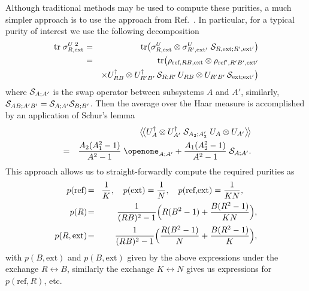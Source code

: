 \documentclass[twocolumn,aps,prl,amsmath,amssymb,floatfix]{revtex4}
\begin{document}
Although traditional methods \cite{Mello90} may be used to compute these
purities, a much simpler approach is to use the approach from
Ref.~. In particular, for a typical purity of interest
we use the following decomposition
\begin{eqnarray}
\text{tr}\; \sigma_{R,\text{ext}}^{U\;2}
&=& \text{tr} \bigl( \sigma_{R,\text{ext}}^U
\otimes \sigma_{R',\text{ext}'}^U \;
{\cal S}_{R,\text{ext};R',\text{ext}'}\bigr)\\
&=& \text{tr} \bigl( \rho_{\text{ref},RB,\text{ext}}\otimes
\rho_{\text{ref}',R'B',\text{ext}'}\nonumber\\
&&\times U_{RB}^\dagger\otimes U_{R'B'}^\dagger\,
{\cal S}_{R;R'}\, U_{RB}\otimes U_{R'B'}\,
{\cal S}_{\text{ext};\text{ext}'} \bigr) \nonumber
\end{eqnarray}
where ${\cal S}_{A;A'}$ is the swap operator between 
subsystems $A$ and $A'$, similarly,
${\cal S}_{AB;A'B'}={\cal S}_{A;A'}{\cal S}_{B;B'}$. Then the average
over the Haar measure is accomplished by an application of Schur's
lemma \cite{Abey06}
\begin{eqnarray}
&&\bigl\langle\!\bigl\langle U_A^\dagger\otimes U_{A'}^\dagger\;
{\cal S}_{A_2;A_2'}\; U_A \otimes U_{A'}\bigr\rangle\!\bigr\rangle
\nonumber \\
&=&\frac{A_2(A_1^2-1)}{A^2-1}\;\openone_{A;A'}
+\frac{A_1(A_2^2-1)}{A^2-1}\;{\cal S}_{A;A'}.
\end{eqnarray}
This approach allows us to straight-forwardly compute the required
purities as
\begin{eqnarray}
p(\text{ref})\!&=&\!\frac{1}{K},\quad
p(\text{ext})=\frac{1}{N},\quad
p(\text{ref,ext})=\frac{1}{KN},~~~~~ \nonumber \\
p(R)\!&=&\!\frac{1}{(RB)^2-1}
\Bigl( R(B^2-1)+\frac{B(R^2-1)}{KN}\Bigr), \\ %
p(R,\text{ext})\!&=&\!\frac{1}{(RB)^2-1}
\Bigl( \frac{R(B^2-1)}{N}+\frac{B(R^2-1)}{K}\Bigr), \nonumber
\end{eqnarray}
with $p(B,\text{ext})$ and $p(B,\text{ext})$ given by the
above expressions under the exchange $R\leftrightarrow B$, similarly
the exchange $K\leftrightarrow N$ gives us expressions for
$p(\text{ref},R)$, etc.
\end{document}
